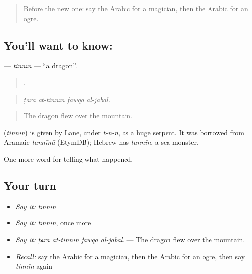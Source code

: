 \label{lesson:AR-C335-tinnin}



\begin{quote}
Before the new one: say the Arabic for a magician, then the Arabic for an ogre.
\end{quote}

\subsection*{You'll want to know: }
\textbf{} — \emph{tinnīn} — \textquotedblleft{}a dragon\textquotedblright{}.

\begin{quote}
   .
\end{quote}

\begin{quote}
\emph{ṭāra at-tinnīn fawqa al-jabal.}
\end{quote}

\begin{quote}
The dragon flew over the mountain.
\end{quote}

\begin{cousinweb}
\textbf{} (\emph{tinnīn}) is given by Lane, under \emph{t-n-n}, as a huge serpent. It was borrowed from Aramaic \emph{tannīnā} (EtymDB); Hebrew has \emph{tannīn}, a sea monster.
\end{cousinweb}

\begin{grammarlens}[title={What you've built}]
One more word for telling what happened.
\end{grammarlens}

\subsection*{Your turn}
\begin{itemize}
\raggedright
  \item \emph{Say it:} \emph{tinnīn}
  \item \emph{Say it:} \emph{tinnīn}, once more
  \item \emph{Say it:} \emph{ṭāra at-tinnīn fawqa al-jabal.} — The dragon flew over the mountain.
  \item \emph{Recall:} say the Arabic for a magician, then the Arabic for an ogre, then say \emph{tinnīn} again
\end{itemize}

